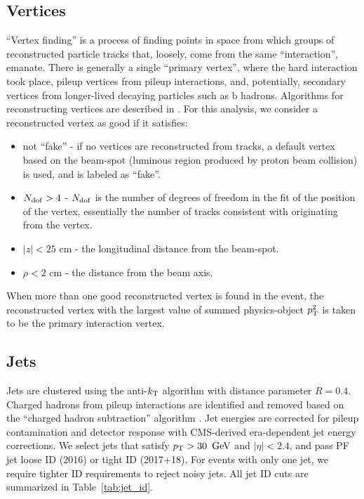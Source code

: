 \subsection{Vertices}
``Vertex finding'' is a process of finding points in space from which groups of reconstructed particle tracks that, loosely,
come from the same ``interaction'', emanate. There is generally a single ``primary vertex'', where the hard interaction
took place, pileup vertices from pileup interactions, and, potentially, secondary vertices from longer-lived decaying particles
such as b hadrons. Algorithms for reconstructing vertices are described in \cite{TRK_vertexing}. For this analysis,
we consider a reconstructed vertex as good if it satisfies:
\begin{itemize}
\item not ``fake'' - if no vertices are reconstructed from tracks, a default vertex based on the beam-spot 
(luminous region produced by proton beam collision) is used, and is labeled as ``fake''.
\item $N_{\mathrm{dof}}>4$ - $N_{\mathrm{dof}}$ is the number of degrees of freedom in the fit of the position
of the vertex, essentially the number of tracks consistent with originating from the vertex.
\item $|z|<25$ cm - the longitudinal distance from the beam-spot.
\item $\rho<2$ cm - the distance from the beam axis.
\end{itemize}

When more than one good reconstructed vertex is found in the event, the reconstructed vertex
with the largest value of summed physics-object $p_{\mathrm{T}}^2$ is taken to be the primary interaction
vertex.

\subsection{Jets}

Jets are clustered using the anti-$k_{\mathrm{T}}$ algorithm with distance parameter $R=0.4$.
Charged hadrons from pileup interactions are identified and removed based on the ``charged hadron
subtraction'' algorithm \cite{JME_pileup_removal_algo}.
Jet energies are corrected for pileup contamination and detector response with CMS-derived
era-dependent jet energy corrections.
We select jets that satisfy $p_{\mathrm{T}}>30~\,\text{Ge\hspace{-.08em}V}$ and $|\eta|<2.4$, and pass PF jet loose ID (2016)
or tight ID (2017+18). For events with only one jet, we require tighter ID requirements to reject noisy jets. 
All jet ID cuts are summarized in Table~\ref{tab:jet_id}.


